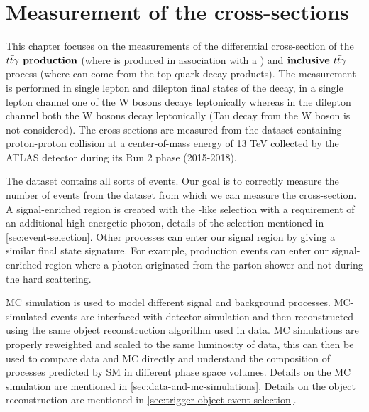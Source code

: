 
\chapter{Measurement of the \tty cross-sections} %
\label{Chapter3} %
This chapter focuses on the measurements of the differential cross-section of the $\textbf{\tty production}$ (where \ttbar is produced in association with a \photon) and $\textbf{inclusive $t\bar{t}\gamma$}$ process (where \photon can come from the top quark decay products). The measurement is performed in single lepton and dilepton final states of the \ttbar decay, in a single lepton channel one of the W bosons decays leptonically whereas in the dilepton channel both the W bosons decay leptonically (Tau decay from the W boson is not considered). The cross-sections are measured from the dataset containing proton-proton collision at a center-of-mass energy of 13 TeV collected by the ATLAS detector during its Run 2 phase (2015-2018). 

The dataset contains all sorts of events. Our goal is to correctly measure the number of \tty events from the dataset from which we can measure the cross-section. A signal-enriched region is created with the \ttbar-like selection with a requirement of an additional high energetic photon, details of the selection mentioned in \cref{sec:event-selection}.  Other processes can enter our signal region by giving a similar final state signature. For example, \ttbar production events can enter our signal-enriched region where a photon originated from the parton shower and not during the hard scattering. 

MC simulation is used to model different signal and background processes. MC-simulated events are interfaced with detector simulation and then reconstructed using the same object reconstruction algorithm used in data. MC simulations are properly reweighted and scaled to the same luminosity of data, this can then be used to compare data and MC directly and understand the composition of processes predicted by SM in different phase space volumes. Details on the MC simulation are mentioned in \cref{sec:data-and-mc-simulations}. Details on the object reconstruction are mentioned in \cref{sec:trigger-object-event-selection}.


